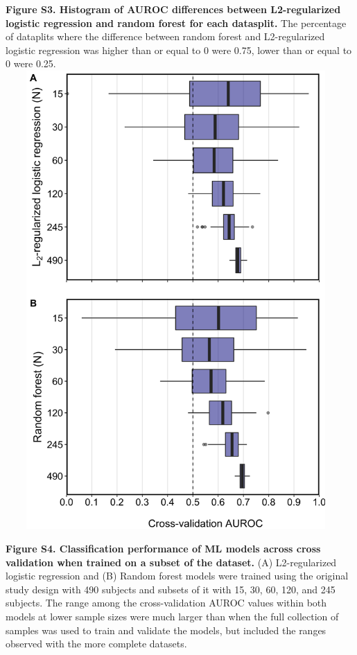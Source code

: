 \documentclass[11pt,]{article}
\begin{document}
\textbf{Figure S3. Histogram of AUROC differences between L2-regularized
logistic regression and random forest for each datasplit.} The
percentage of dataplits where the difference between random forest and
L2-regularized logistic regression was higher than or equal to 0 were
0.75, lower than or equal to 0 were 0.25. \newpage
\includegraphics[height=17.5cm, width=13cm]{Figure_S4.png}

\textbf{Figure S4. Classification performance of ML models across cross
validation when trained on a subset of the dataset.} (A) L2-regularized
logistic regression and (B) Random forest models were trained using the
original study design with 490 subjects and subsets of it with 15, 30,
60, 120, and 245 subjects. The range among the cross-validation AUROC
values within both models at lower sample sizes were much larger than
when the full collection of samples was used to train and validate the
models, but included the ranges observed with the more complete
datasets.
\end{document}
